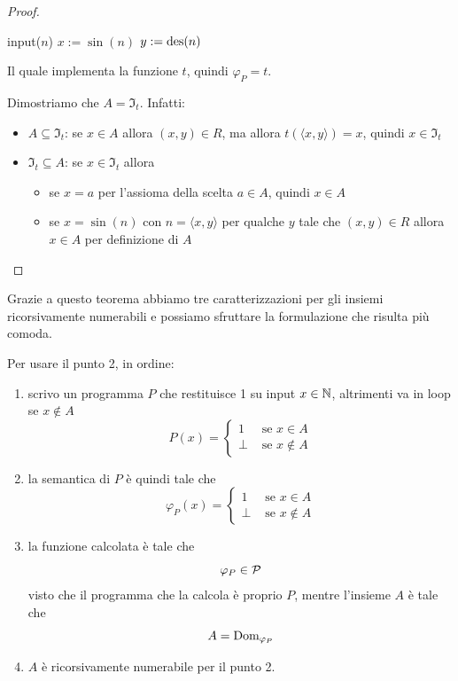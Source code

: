 \begin{proof}
	\begin{center}
		\begin{minipage}{.6\textwidth}
			\begin{tcolorbox}[
				colback=white,
				sharp corners,
				boxrule=.3mm,
				left=20pt,
				top=0pt,
				bottom=0pt
				]
				\begin{algorithm}[H]
					\SetAlgoNoEnd
					input($n$)\;
					$x:=\sin(n)$\;
					$y:=\operatorname{des}(n)$\;
				\end{algorithm}
			\end{tcolorbox}
		\end{minipage}
	\end{center}

	Il quale implementa la funzione $t$, quindi $\varphi_P = t$.

	Dimostriamo che $A = \Im_t$. Infatti:
	\begin{itemize}
		\item $A \subseteq \Im_t$: se $x \in A$ allora $(x,y) \in R$, ma allora $t (\langle x,y \rangle) = x$, quindi $x \in \Im_t$
		\item $\Im_t \subseteq A$: se $x \in \Im_t$ allora
		\begin{itemize}
			\item se $x = a$ per l'assioma della scelta $a \in A$, quindi $x \in A$
			\item se $x = \sin(n)$ con $n = \langle x,y \rangle$ per qualche $y$ tale che $(x,y) \in R$ allora $x \in A$ per definizione di $A$
		\end{itemize}
	\end{itemize}

\end{proof}

Grazie a questo teorema abbiamo tre caratterizzazioni per gli insiemi ricorsivamente numerabili e possiamo sfruttare la formulazione che risulta più comoda.

Per usare il punto 2, in ordine:
\begin{enumerate}
	\item scrivo un programma $P$ che restituisce 1 su input $x \in \mathbb{N}$, altrimenti va in loop se $x \notin A$
	$$
	P(x) = \begin{cases}
		1 & \text{ se } x \in A \\
		\bot & \text{ se } x \notin A
	\end{cases}
	$$
	\item la semantica di $P$ è quindi tale che
	$$
	\varphi_P (x) = \begin{cases}
		1 & \text{ se } x \in A \\
		\bot & \text{ se } x \notin A
	\end{cases}
	$$
	\item la funzione calcolata è tale che
	$$ \varphi_P \in \mathcal{P} $$
	visto che il programma che la calcola è proprio $P$, mentre l'insieme $A$ è tale che
	$$ A = \text{Dom}_{\varphi_P}$$
	\item $A$ è ricorsivamente numerabile per il punto 2.
\end{enumerate}

